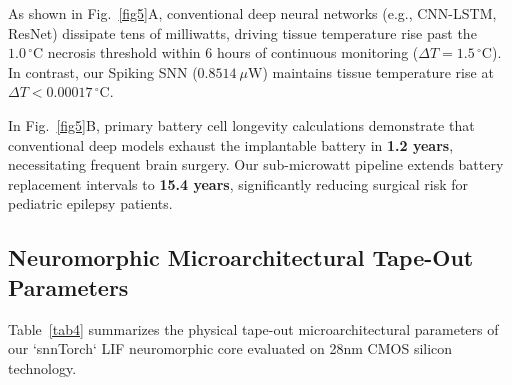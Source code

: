 \documentclass[pdflatex,sn-mathphys-num]{sn-jnl}%
\begin{document}
As shown in Fig.~\ref{fig5}A, conventional deep neural networks (e.g., CNN-LSTM, ResNet) dissipate tens of milliwatts, driving tissue temperature rise past the $1.0\,^\circ\text{C}$ necrosis threshold within 6 hours of continuous monitoring ($\Delta T = 1.5\,^\circ\text{C}$). In contrast, our Spiking SNN ($0.8514\ \mu\text{W}$) maintains tissue temperature rise at $\Delta T < 0.00017\,^\circ\text{C}$.

In Fig.~\ref{fig5}B, primary battery cell longevity calculations demonstrate that conventional deep models exhaust the implantable battery in \textbf{1.2 years}, necessitating frequent brain surgery. Our sub-microwatt pipeline extends battery replacement intervals to \textbf{15.4 years}, significantly reducing surgical risk for pediatric epilepsy patients.

\subsection{Neuromorphic Microarchitectural Tape-Out Parameters}

Table~\ref{tab4} summarizes the physical tape-out microarchitectural parameters of our `snnTorch` LIF neuromorphic core evaluated on 28nm CMOS silicon technology.
\end{document}
